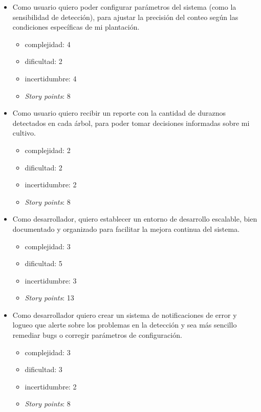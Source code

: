 \documentclass[
11pt %
]{charter}
\begin{document}
\begin{itemize}
\item Como usuario quiero poder configurar parámetros del sistema (como la sensibilidad de detección), para ajustar la precisión del conteo según las condiciones específicas de mi plantación.
	\begin{itemize}
	\item complejidad: 4
	\item dificultad: 2
	\item incertidumbre: 4
	\item \textit{Story points}: 8 
	\end{itemize}
\end{itemize}

\begin{itemize}
\item Como usuario quiero recibir un reporte con la cantidad de duraznos detectados en cada árbol, para poder tomar decisiones informadas sobre mi cultivo.
	\begin{itemize}
	\item complejidad: 2
	\item dificultad: 2
	\item incertidumbre: 2
	\item \textit{Story points}: 8 
	\end{itemize}
\end{itemize}

\begin{itemize}
\item Como desarrollador, quiero establecer un entorno de desarrollo escalable, bien documentado y organizado para facilitar la mejora continua del sistema.
	\begin{itemize}
	\item complejidad: 3
	\item dificultad: 5
	\item incertidumbre: 3
	\item \textit{Story points}: 13 
	\end{itemize}
\end{itemize}

\begin{itemize}
\item Como desarrollador quiero crear un sistema de notificaciones de error y logueo que alerte sobre los problemas en la detección y sea más sencillo remediar bugs o corregir parámetros de configuración.
	\begin{itemize}
	\item complejidad: 3
	\item dificultad: 3
	\item incertidumbre: 2
	\item \textit{Story points}: 8 
	\end{itemize}
\end{itemize}
\end{document}
